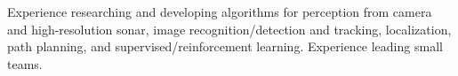Experience researching and developing algorithms for perception from camera and high-resolution sonar, image recognition/detection and tracking, localization, path planning, and supervised/reinforcement learning. Experience leading small teams.
